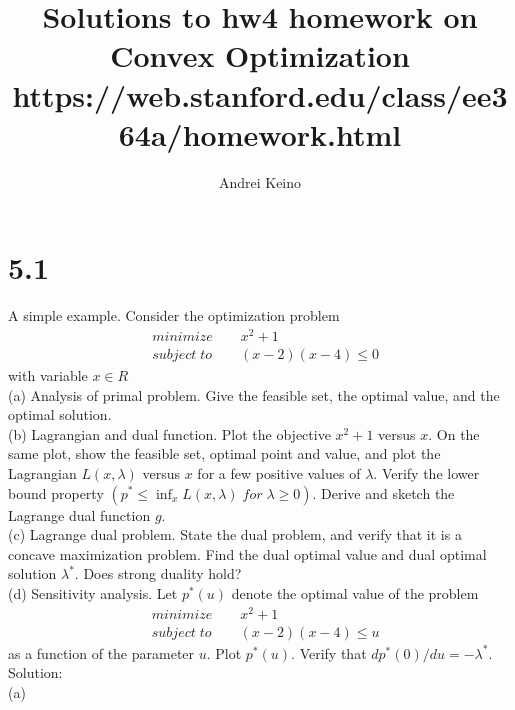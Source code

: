 \documentclass{article}
\begin{document}
\title{Solutions to hw4 homework on Convex Optimization https://web.stanford.edu/class/ee364a/homework.html}
\author{Andrei Keino}
\maketitle
\section*{5.1}
A simple example. Consider the optimization problem 
\begin{align*}
&minimize \qquad x^2 + 1 \\
&subject \; to  \qquad (x - 2)(x - 4) \leq 0
\end{align*} 
with variable $x \in R$\\

(a) Analysis of primal problem. Give the feasible set, the optimal value, and the optimal solution.\\

(b) Lagrangian and dual function. Plot the objective
$x^2 + 1$ versus $x$. On the same plot,
show the feasible set, optimal point and value, and plot the Lagrangian $L(x, \lambda)$ versus $x$ for a few positive values of $\lambda.$ Verify the lower bound property $(p^* \leq \inf_x L(x, \lambda) \;for\; \lambda \geq 0 ).$ Derive and sketch the Lagrange dual function $g$. \\

(c) Lagrange dual problem. State the dual problem, and verify that it is a concave maximization problem. Find the dual optimal value and dual optimal solution $\lambda ^*$. Does strong duality hold? \\

(d) Sensitivity analysis. Let $p^*(u)$ denote the optimal value of the problem 
\begin{align*}
&minimize \qquad x^2 + 1 \\
&subject \; to  \qquad (x - 2)(x - 4) \leq u
\end{align*} 
as a function of the parameter $u.$ Plot $p^*(u).$ 
Verify that $dp^*(0) / du = - \lambda^*.$ \\

Solution: \\

(a)\\
\end{document}
